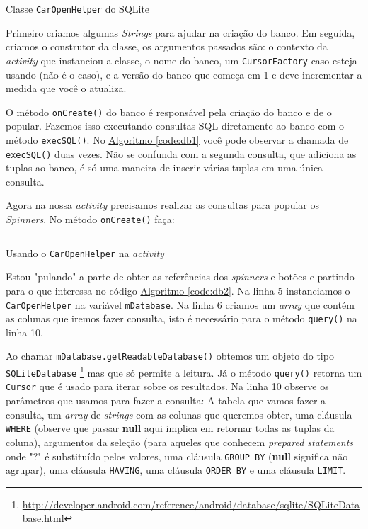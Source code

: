 \documentclass[a4paper,12pt,brazil,oneside]{book}
\begin{document}
		\begin{listing}[H]
		\inputminted[linenos=true,fontsize=\small,frame=lines, framesep=2mm, tabsize=2,numbersep=5pt]{java}{src/api/storage/db1.java}
		\caption{Classe \texttt{CarOpenHelper} do SQLite}
		\label{code:db1}
		\end{listing} 	

		Primeiro criamos algumas \emph{Strings} para ajudar na criação do banco. Em seguida, criamos o construtor da classe, os argumentos passados são: o contexto da \emph{activity} que instanciou a classe, o nome do banco, um \texttt{CursorFactory} caso esteja usando (não é o caso), e a versão do banco que começa em 1 e deve incrementar a medida que você o atualiza. 
		
		O método \texttt{onCreate()} do banco é responsável pela criação do banco e de o popular. Fazemos isso executando consultas SQL diretamente ao banco com o método \texttt{execSQL()}. No \hyperref[code:db1]{Algoritmo \ref*{code:db1}} você pode observar a chamada de \texttt{execSQL()} duas vezes. Não se confunda com a segunda consulta, que adiciona as tuplas ao banco, é só uma maneira de inserir várias tuplas em uma única consulta.

		Agora na nossa \emph{activity} precisamos realizar as consultas para popular os \emph{Spinners}. No método \texttt{onCreate()} faça: 

		\begin{listing}[H]
		\inputminted[linenos=true,fontsize=\small,frame=lines, framesep=2mm, tabsize=2,numbersep=5pt]{java}{src/api/storage/db2.java}
		\caption{Usando o \texttt{CarOpenHelper} na \emph{activity}}
		\label{code:db2}
		\end{listing} 	

		Estou "pulando" a parte de obter as referências dos \emph{spinners} e botões e partindo para o que interessa no código \hyperref[code:db2]{Algoritmo \ref*{code:db2}}. Na linha 5 instanciamos o \texttt{CarOpenHelper} na variável \texttt{mDatabase}. Na linha 6 criamos um \emph{array} que contém as colunas que iremos fazer consulta, isto é necessário para o método \texttt{query()} na linha 10.

		Ao chamar \texttt{mDatabase.getReadableDatabase()} obtemos um objeto do tipo \\ \texttt{SQLiteDatabase}
\footnote{\href{http://developer.android.com/reference/android/database/sqlite/SQLiteDatabase.html}{http://developer.android.com/reference/android/database/sqlite/SQLiteDatabase.html}}
 mas que só permite a leitura. Já o método \texttt{query()} retorna um \texttt{Cursor} que é usado para iterar sobre os resultados. Na linha 10 observe os parâmetros que usamos para fazer a consulta: A tabela que vamos fazer a consulta, um \emph{array} de \emph{strings} com as colunas que queremos obter,  uma cláusula \texttt{WHERE} (observe que passar \textbf{null} aqui implica em retornar todas as tuplas da coluna), argumentos da seleção (para aqueles que conhecem \emph{prepared statements} onde "?" é substituído pelos valores, uma cláusula \texttt{GROUP BY} (\textbf{null} significa não agrupar), uma cláusula \texttt{HAVING}, uma cláusula \texttt{ORDER BY} e uma cláusula \texttt{LIMIT}.
\end{document}
